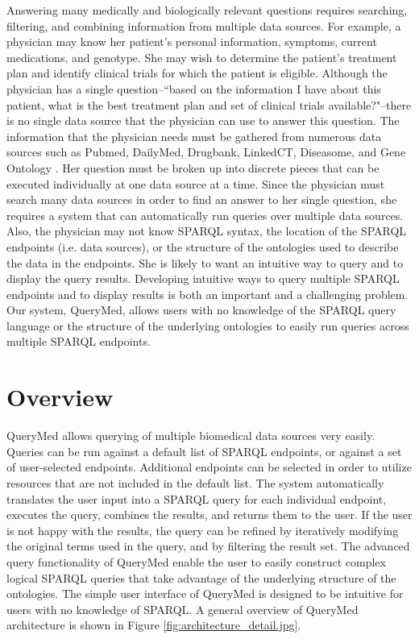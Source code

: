 \documentclass{acm_proc_article-sp}
\begin{document}
Answering many medically and biologically relevant questions requires searching, filtering, and combining information from multiple data sources.  For example, a physician may know her patient's personal information, symptoms, current medications, and genotype. She may wish to determine the patient's treatment plan and identify clinical trials for which the patient is eligible.  Although the physician has a single question--``based on the information I have about this patient, what is the best treatment plan and set of clinical trials available?"--there is no single data source that the physician can use to answer this question. The information that the physician needs must be gathered from numerous data sources such as Pubmed, DailyMed, Drugbank, LinkedCT, Diseasome,  and Gene Ontology \cite{Pubmed, DailyMed, Drugbank, LinkedCT, Diseasome, GO}. Her question must be broken up into discrete pieces that can be executed individually at one data source at a time.  Since the physician must search many data sources in order to find an answer to her single question, she requires a system that can automatically run queries over multiple data sources. Also, the physician may not know SPARQL syntax, the location of the SPARQL endpoints (i.e. data sources), or the structure of the ontologies used to describe the data in the endpoints. She is likely to want an intuitive way to query and to display the query results.  Developing intuitive ways to query multiple SPARQL endpoints and to display results is both an important and a challenging problem.  Our system, QueryMed, allows users with no knowledge of the SPARQL query language or the structure of the underlying ontologies to easily run queries across multiple SPARQL endpoints.

\section{Overview}

QueryMed allows querying of multiple biomedical data sources very easily.  Queries can be run against a default list of SPARQL endpoints, or against a set of user-selected endpoints.  Additional endpoints can be selected in order to utilize resources that are not included in the default list.  The system automatically translates the user input into a SPARQL query for each individual endpoint, executes the query, combines the results, and returns them to the user.  If the user is not happy with the results, the query can be refined  by iteratively modifying the original terms used in the query, and by filtering the result set.  The advanced query functionality of QueryMed enable the user to easily construct complex logical SPARQL queries that take advantage of the underlying structure of the ontologies. The simple user interface of QueryMed is designed to be intuitive for users with no knowledge of SPARQL. A general overview of QueryMed architecture is shown in Figure \ref{fig:architecture_detail.jpg}.
\end{document}
